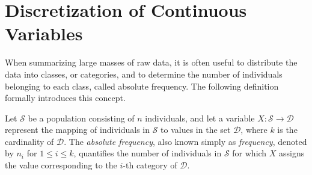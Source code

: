 





%
%

\section{Discretization of Continuous Variables}
\label{sec:discretization_continuous_variables}

When summarizing large masses of raw data, it is often useful to distribute the data into classes, or categories, and to determine the number of individuals belonging to each class, called absolute frequency. The following definition formally introduces this concept.

\begin{definition}
Let $\mathcal{S}$ be a population consisting of $n$ individuals, and let a variable $X: \mathcal{S} \rightarrow \mathcal{D}$ represent the mapping of individuals in $\mathcal{S}$ to values in the set $\mathcal{D}$, where $k$ is the cardinality of $\mathcal{D}$. The \emph{absolute frequency}, also known simply as \emph{frequency}, denoted by $n_i$ for $1 \leq i \leq k$, quantifies the number of individuals in $\mathcal{S}$ for which $X$ assigns the value corresponding to the $i$-th category of $\mathcal{D}$.
\end{definition}

